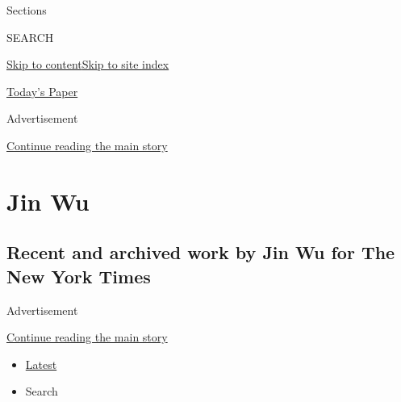 Sections

SEARCH

\protect\hyperlink{site-content}{Skip to
content}\protect\hyperlink{site-index}{Skip to site index}

\href{https://myaccount.nytimes.com/auth/login?response_type=cookie\&client_id=vi}{}

\href{https://www.nytimes.com/section/todayspaper}{Today's Paper}

Advertisement

\protect\hyperlink{after-top}{Continue reading the main story}

\hypertarget{jin-wu}{%
\section{Jin Wu}\label{jin-wu}}

\hypertarget{recent-and-archived-work-by-jin-wu-for-the-new-york-times}{%
\subsection{Recent and archived work by Jin Wu for The New York
Times}\label{recent-and-archived-work-by-jin-wu-for-the-new-york-times}}

Advertisement

\protect\hyperlink{after-mid1}{Continue reading the main story}

\begin{itemize}
\tightlist
\item
  \protect\hyperlink{stream-panel}{Latest}
\item
  Search
\end{itemize}

